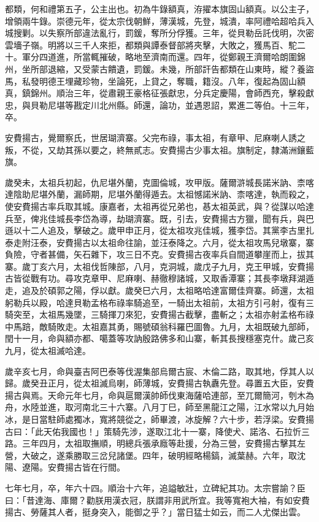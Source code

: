 \begin{pinyinscope}
都類，何和禮第五子，公主出也。初為牛錄額真，洊擢本旗固山額真。以公主子，增領兩牛錄。崇德元年，從太宗伐朝鮮，薄漢城，先登，城潰，率阿禮哈超哈兵入城搜剿。以失察所部違法亂行，罰鍰，奪所分俘獲。三年，從貝勒岳託伐明，次密雲墻子嶺。明將以三千人來拒，都類與譚泰督部將夾擊，大敗之，獲馬百、駝二十。軍分四道進，所當輒摧破，略地至濟南而還。四年，從鄭親王濟爾哈朗圍錦州，坐所部退縮，又受蒙古饋遺，罰鍰。未幾，所部訐告都類在山東時，縱？養盜馬，私發明德王埋藏珍物，坐論死，上貸之，奪職，籍沒。八年，復起為固山額真，鎮錦州。順治三年，從肅親王豪格征張獻忠，分兵定慶陽，會師西充，擊殺獻忠，與貝勒尼堪等戡定川北州縣。師還，論功，並遇恩詔，累進二等伯。十三年，卒。

安費揚古，覺爾察氏，世居瑚濟寨。父完布祿，事太祖，有章甲、尼麻喇人誘之叛，不從，又劫其孫以要之，終無貳志。安費揚古少事太祖。旗制定，隸滿洲鑲藍旗。

歲癸未，太祖兵初起，仇尼堪外蘭，克圖倫城，攻甲版。薩爾滸城長諾米訥、柰喀達陰助尼堪外蘭，漏師期，尼堪外蘭得遁去。太祖憾諾米訥、柰喀達，執而殺之，使安費揚古率兵取其城。康嘉者，太祖再從兄弟也，惎太祖英武，與？從謀以哈達兵至，俾兆佳城長李岱為導，劫瑚濟寨。既，引去，安費揚古方獵，聞有兵，與巴遜以十二人追及，擊破之。歲甲申正月，從太祖攻兆佳城，獲李岱。其黨李古里扎泰走附汪泰，安費揚古以太祖命往諭，並汪泰降之。六月，從太祖攻馬兒墩寨，寨負險，守者甚備，矢石雜下，攻三日不克。安費揚古夜率兵自間道攀崖而上，拔其寨。歲丁亥六月，太祖伐哲陳部，八月，克洞城，歲戊子九月，克王甲城，安費揚古皆從戰有功。尋攻克章甲、尼麻喇、赫徹穆諸城，又取香潭寨；其長李墩拜湖遁走，追及於碩郭之陽，俘以獻。歲癸巳六月，太祖略哈達富爾佳齊寨。師還，太祖躬勒兵以殿，哈達貝勒孟格布祿率騎追至，一騎出太祖前，太祖方引弓射，復有三騎突至，太祖馬幾墜，三騎揮刀來犯，安費揚古截擊，盡斬之；太祖亦射孟格布祿中馬踣，敵騎敗走。太祖嘉其勇，賜號碩翁科羅巴圖魯。九月，太祖既破九部師，閏十一月，命與額亦都、噶蓋等攻訥殷路佛多和山寨，斬其長搜穩塞克什。歲己亥九月，從太祖滅哈達。

歲辛亥七月，命與臺吉阿巴泰等伐渥集部烏爾古宸、木倫二路，取其地，俘其人以歸。歲癸丑正月，從太祖滅烏喇，師薄城，安費揚古執纛先登。尋置五大臣，安費揚古與焉。天命元年七月，命與扈爾漢帥師伐東海薩哈連部，至兀爾簡河，刳木為舟，水陸並進，取河南北三十六寨。八月丁巳，師至黑龍江之陽，江水常以九月始冰，是日當駐師處獨冰，寬將競從之，師畢渡，冰旋解？六十步，若浮梁。安費揚古曰：「此天佑我國也！」策騎先涉，遂取江北十一寨，降使犬、諾洛、石拉忻三路。三年四月，太祖取撫順，明總兵張承廕等赴援，分為三營，安費揚古擊其左營，大破之，遂乘勝取三岔兒諸堡。四年，破明經略楊鎬，滅葉赫。六年，取沈陽、遼陽。安費揚古皆在行間。

七年七月，卒，年六十四。順治十六年，追謚敏壯，立碑紀其功。太宗嘗諭？臣曰：「昔達海、庫爾？勸朕用漢衣冠，朕謂非用武所宜。我等寬袍大袖，有如安費揚古、勞薩其人者，挺身突入，能御之乎？」當日猛士如云，而二人尤傑出雲。


\end{pinyinscope}
